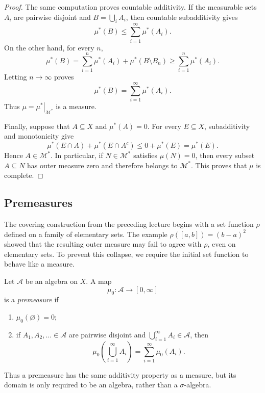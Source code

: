 \begin{proof}
  The same computation proves countable additivity. If the measurable
  sets $A_i$ are pairwise disjoint and $B=\bigcup_iA_i$, then countable
  subadditivity gives
  \[
    \mu^*(B)\leq\sum_{i=1}^{\infty}\mu^*(A_i).
  \]
  On the other hand, for every $n$,
  \[
    \mu^*(B)
    =\sum_{i=1}^n\mu^*(A_i)+\mu^*(B\setminus B_n)
    \geq\sum_{i=1}^n\mu^*(A_i).
  \]
  Letting $n\to\infty$ proves
  \[
    \mu^*(B)=\sum_{i=1}^{\infty}\mu^*(A_i).
  \]
  Thus $\mu=\left.\mu^*\right|_{\mathcal M^*}$ is a measure.

  Finally, suppose that $A\subseteq X$ and $\mu^*(A)=0$. For every
  $E\subseteq X$, subadditivity and monotonicity give
  \[
    \mu^*(E\cap A)+\mu^*(E\cap A^c)
    \leq0+\mu^*(E)=\mu^*(E).
  \]
  Hence $A\in\mathcal M^*$. In particular, if
  $N\in\mathcal M^*$ satisfies $\mu(N)=0$, then every subset $A\subseteq
  N$ has outer measure zero and therefore belongs to $\mathcal M^*$.
  This proves that $\mu$ is complete.
\end{proof}

\subsection{Premeasures}

The covering construction from the preceding lecture begins with a set
function $\rho$ defined on a family of elementary sets. The example
$\rho([a,b])=(b-a)^2$ showed that the resulting outer measure may fail to
agree with $\rho$, even on elementary sets. To prevent this collapse, we
require the initial set function to behave like a measure.

\begin{definition}[Premeasure]
  Let $\mathcal A$ be an algebra on $X$. A map
  \[
    \mu_0\colon\mathcal A\longrightarrow[0,\infty]
  \]
  is a \emph{premeasure} if
  \begin{enumerate}[label=(\roman*)]
    \item $\mu_0(\varnothing)=0$;
    \item if $A_1,A_2,\ldots\in\mathcal A$ are pairwise disjoint and
      $\bigcup_{i=1}^{\infty}A_i\in\mathcal A$, then
      \[
        \mu_0\left(\bigcup_{i=1}^{\infty}A_i\right)
        =\sum_{i=1}^{\infty}\mu_0(A_i).
      \]
  \end{enumerate}
\end{definition}

Thus a premeasure has the same additivity property as a measure, but its
domain is only required to be an algebra, rather than a $\sigma$-algebra.

